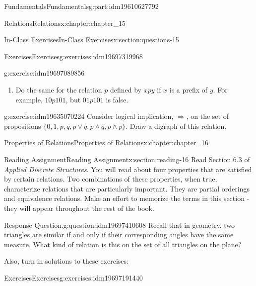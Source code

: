 \documentclass[oneside,10pt,]{book}
\numberwithin{equation}{section}
\begin{document}
\begin{partptx}{Fundamentals}{}{Fundamentals}{}{}{g:part:idm19610627792}
\begin{chapterptx}{Relations}{}{Relations}{}{}{x:chapter:chapter_15}
\begin{sectionptx}{In-Class Exercises}{}{In-Class Exercises}{}{}{x:section:questions-15}
\begin{exercises-subsection-numberless}{Exercises}{}{Exercises}{}{}{g:exercises:idm19697319968}
\begin{exercisegroup}
\begin{divisionexerciseeg}{3}{}{}{g:exercise:idm19697089856}
\begin{enumerate}[label=(\alph*)]
\item{}Do the same for the relation \(p\) defined by \(x p y\) if \(x\) is a prefix of \(y\). For example, \(10 p 101\), but \(01 p 101\) is false.%
\end{enumerate}
%
\end{divisionexerciseeg}%
\begin{divisionexerciseeg}{4}{}{}{g:exercise:idm19635070224}%
Consider logical implication, \(\Rightarrow\), on the set of propositions \(\{0,1,p,q,p\lor q, p\land q, p\land p \}\). Draw a digraph of this relation.%
\end{divisionexerciseeg}%
\end{exercisegroup}
\par\medskip\noindent
\end{exercises-subsection-numberless}
\end{sectionptx}
\end{chapterptx}
%
\typeout{************************************************}
\typeout{************************************************}
%
\begin{chapterptx}{Properties of Relations}{}{Properties of Relations}{}{}{x:chapter:chapter_16}
\index{}%
%
%
\typeout{************************************************}
\typeout{************************************************}
%
\begin{sectionptx}{Reading Assignment}{}{Reading Assignment}{}{}{x:section:reading-16}
Read Section 6.3 of \emph{Applied Discrete Structures}.  You will read about four properties that are satisfied by certain relations.  Two combinations of these properties, when true, characterize relations that are particularly important.  They are partial orderings and equivalence relations. Make an effort to memorize the terms in this section - they will appear throughout the rest of the book.%
\begin{question}{Response Question.}{g:question:idm19697410608}%
Recall that in geometry, two triangles are similar if and only if their corresponding angles have the same measure. What kind of relation is this on the set of all triangles on the plane?%
\end{question}
Also, turn in solutions to these exercises:%
%
%
\typeout{************************************************}
\typeout{************************************************}
%
\begin{exercises-subsection-numberless}{Exercises}{}{Exercises}{}{}{g:exercises:idm19697191440}

\end{exercises-subsection-numberless}
\end{sectionptx}
\end{chapterptx}
\end{partptx}
\end{document}
